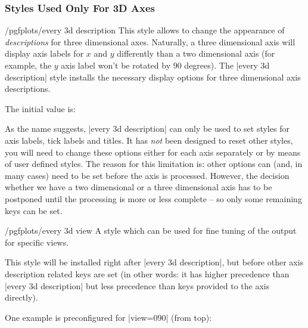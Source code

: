 \subsubsection{Styles Used Only For 3D Axes}
\begin{stylekey}{/pgfplots/every 3d description}
	This style allows to change the appearance of \emph{descriptions} for three dimensional axes. Naturally, a three dimensional axis will display axis labels for $x$ and $y$ differently  than a two dimensional axis (for example, the $y$ axis label won't be rotated by 90 degrees). The |every 3d description| style installs the necessary display options for three dimensional axis descriptions.

	The initial value is:
\begin{codeexample}
\end{codeexample}

	As the name suggests, |every 3d description| can only be used to set styles for axis labels, tick labels and titles. It has \emph{not} been designed to reset other styles, you will need to change these options either for each axis separately or by means of user defined styles. The reason for this limitation is: other options can (and, in many cases) need to be set before the axis is processed. However, the decision whether we have a two dimensional or a three dimensional axis has to be postponed until the processing is more or less complete -- so only some remaining keys can be set.	
\end{stylekey}

\begin{stylekey}{/pgfplots/every 3d view }
	A style which can be used for fine tuning of the output for specific views.

	This style will be installed right after |every 3d description|, but before other axis description related keys are set (in other words: it has higher precedence than |every 3d description| but less precedence than keys provided to the axis directly).

	One example is preconfigured for |view={0}{90}| (from top):
\begin{codeexample}
\end{codeexample}
\end{stylekey}


